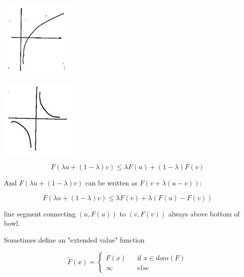 \begin{marginfigure}
	\centering
	\includegraphics[width=1.5in,height=1.5in]{figures/ch08/figure1030_9.png}
\end{marginfigure}

\begin{marginfigure}
	\centering
	\includegraphics[width=1.5in,height=1.5in]{figures/ch08/figure1030_10.png}
\end{marginfigure}


\begin{equation*}
F(\lambda u + (1-\lambda)v) \leq \lambda F(u) + (1-\lambda)F(v)
\end{equation*}

And $F(\lambda u + (1-\lambda)v)$ can be written as $F(v + \lambda(u-v))$:

\begin{equation*}
F(\lambda u + (1-\lambda)v) \leq \lambda F(v) + \lambda(F(u)-F(v))
\end{equation*}

line segment connecting $(u,F(u))$ to $(v, F(v))$ always above bottom of bowl.


Sometimes define an "extended value" function

$$ \tilde{F}(x)=\left\{
\begin{array}{rcl}
F(x)       &      & \text{if } x\in dom(F)\\
\infty   &      & else
\end{array} \right. 
$$

